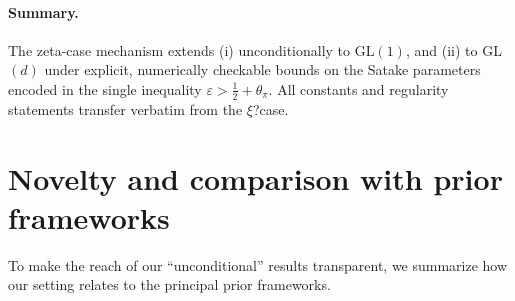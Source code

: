 ﻿\documentclass[12pt,a4paper]{article}
\theoremstyle{definition}
\theoremstyle{remark}
\begin{document}
\paragraph{Summary.}
The zeta-case mechanism extends (i) unconditionally to GL$(1)$, and (ii) to GL$(d)$ under explicit, numerically checkable bounds on the Satake parameters encoded in the single inequality $\varepsilon>\tfrac12+\theta_\pi$. 
All constants and regularity statements transfer verbatim from the $\xi$?case.

\section{Novelty and comparison with prior frameworks}\label{sec:novelty-comparison}

To make the reach of our ``unconditional'' results transparent, we summarize how our setting relates to the principal prior frameworks.
\end{document}
